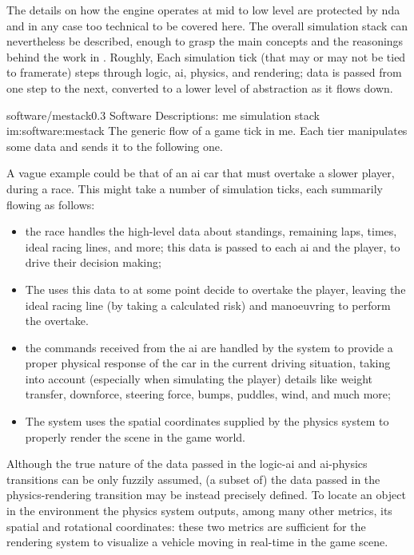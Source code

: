 The details on how the engine operates at mid to low level are protected by \gls{nda} and in any case too technical to be covered here. The overall simulation stack can nevertheless be described, enough to grasp the main concepts and the reasonings behind the work in . Roughly, Each simulation tick (that may or may not be tied to framerate) steps through logic, \gls{ai}, physics, and rendering; data is passed from one step to the next, converted to a lower level of abstraction as it flows down.

\begin{image}
	{software/mestack}{0.3}
	{Software Descriptions: \gls{me} simulation stack}
	{im:software:mestack}
	{}
	{The generic flow of a game tick in \gls{me}. Each tier manipulates some data and sends it to the following one.} %
\end{image}

A vague example could be that of an \gls{ai} car that must overtake a slower player, during a race. This might take a number of simulation ticks, each summarily flowing as follows:

\begin{itemize}
	\item the race  handles the high-level data about standings, remaining laps, times, ideal racing lines, and more; this data is passed to each \gls{ai} and the player, to drive their decision making;
	\item The  uses this data to at some point decide to overtake the player, leaving the ideal racing line (by taking a calculated risk) and manoeuvring to perform the overtake.
	\item the commands received from the \gls{ai} are handled by the  system to provide a proper physical response of the car in the current driving situation, taking into account (especially when simulating the player) details like weight transfer, downforce, steering force, bumps, puddles, wind, and much more;
	\item The  system uses the spatial coordinates supplied by the physics system to properly render the scene in the game world.
\end{itemize}

Although the true nature of the data passed in the logic-\gls{ai} and \gls{ai}-physics transitions can be only fuzzily assumed, (a subset of) the data passed in the physics-rendering transition may be instead precisely defined. To locate an object in the environment the physics system outputs, among many other metrics, its spatial and rotational coordinates: these two metrics are sufficient for the rendering system to visualize a vehicle moving in real-time in the game scene.

